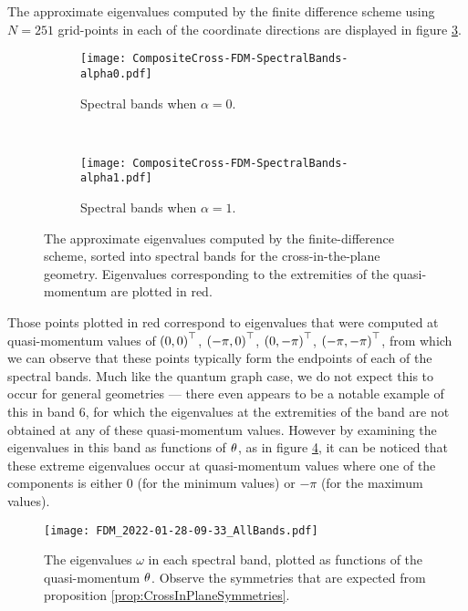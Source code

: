 The approximate eigenvalues computed by the finite difference scheme using $N=251$ grid-points in each of the coordinate directions are displayed in figure \ref{fig:CompositeCross-FDM-SpectralBands}.
\begin{figure}[b!]
	\centering
	\begin{subfigure}[t]{0.45\textwidth}
		\centering
		\texttt{[image: CompositeCross-FDM-SpectralBands-alpha0.pdf]}
		\caption[]{\label{fig:CompositeCross-FDM-SpectralBands-alpha0} Spectral bands when $\alpha=0$.}
	\end{subfigure}
	~
	\begin{subfigure}[t]{0.45\textwidth}
		\centering
		\texttt{[image: CompositeCross-FDM-SpectralBands-alpha1.pdf]}
		\caption[]{\label{fig:CompositeCross-FDM-SpectralBands-alpha1} Spectral bands when $\alpha=1$.}
	\end{subfigure}
	\caption[Spectral bands of \eqref{eq:SI-WaveEqn}, computed via solution of the problem \eqref{eq:SI-StrongForm}.]{\label{fig:CompositeCross-FDM-SpectralBands} The approximate eigenvalues computed by the finite-difference scheme, sorted into spectral bands for the cross-in-the-plane geometry. Eigenvalues corresponding to the extremities of the quasi-momentum are plotted in red.}
\end{figure}
Those points plotted in red correspond to eigenvalues that were computed at quasi-momentum values of $\left( 0,0 \right)^\top$, $\left( -\pi,0 \right)^\top$, $\left( 0,-\pi \right)^\top$, $\left( -\pi,-\pi \right)^\top$, from which we can observe that these points typically form the endpoints of each of the spectral bands.
Much like the quantum graph case, we do not expect this to occur for general geometries --- there even appears to be a notable example of this in band 6, for which the eigenvalues at the extremities of the band are not obtained at any of these quasi-momentum values.
However by examining the eigenvalues in this band as functions of $\theta$, as in figure \ref{fig:FDM_2022-01-28-09-33_AllBands}, it can be noticed that these extreme eigenvalues occur at quasi-momentum values where one of the components is either 0 (for the minimum values) or $-\pi$ (for the maximum values). 
\begin{figure}[b!]
	\centering
	\texttt{[image: FDM\_2022-01-28-09-33\_AllBands.pdf]}
	\caption[Dispersion relations for the first 10 spectral bands of \eqref{eq:SI-WaveEqn}, computed via solution of \eqref{eq:SI-StrongForm} with $\alpha=0$.]{\label{fig:FDM_2022-01-28-09-33_AllBands} The eigenvalues $\omega$ in each spectral band, plotted as functions of the quasi-momentum $\theta$. Observe the symmetries that are expected from proposition \ref{prop:CrossInPlaneSymmetries}.}
\end{figure}

